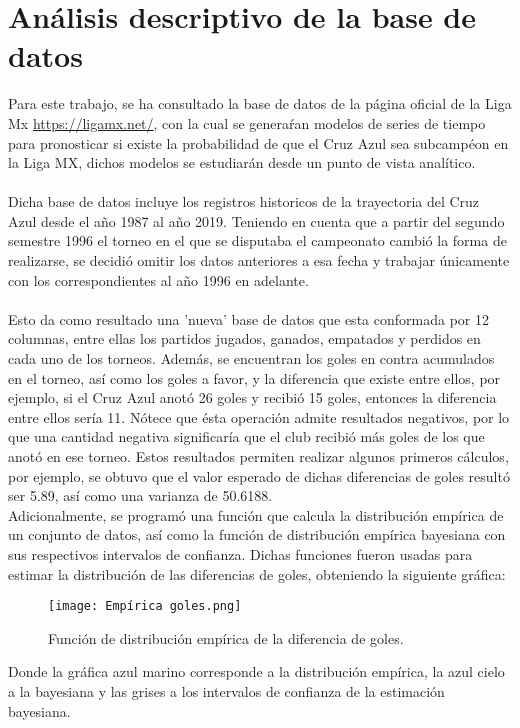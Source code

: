 \documentclass{article}
\theoremstyle{remark}
\begin{document}
\newpage
\section{Análisis descriptivo de la base de datos}
Para este trabajo, se ha consultado la base de datos de la página oficial de la Liga Mx \url{https://ligamx.net/}, con la cual se generaŕan modelos de series de tiempo para pronosticar si existe la probabilidad de que el Cruz Azul sea subcampéon en la Liga MX, dichos modelos se estudiarán desde un punto de vista analítico.\\ \\ 
Dicha base de datos incluye los registros historicos de la trayectoria del Cruz Azul desde el año 1987 al año 2019. Teniendo en cuenta que a partir del segundo semestre 1996 el torneo en el que se disputaba el campeonato cambió la forma de realizarse, se decidió omitir los datos anteriores a esa fecha y trabajar únicamente con los correspondientes al año 1996 en adelante.\\ \\
Esto da como resultado una 'nueva' base de datos que esta conformada por 12 columnas, entre ellas los partidos jugados, ganados, empatados y perdidos en cada uno de los torneos. Además, se encuentran los goles en contra acumulados en el torneo, así como los goles a favor, y la diferencia que existe entre ellos, por ejemplo, si el Cruz Azul anotó 26 goles y recibió 15 goles, entonces la diferencia entre ellos sería 11. Nótece que ésta operación admite resultados  negativos, por lo que una cantidad negativa significaría que el club recibió más goles de los que anotó en ese torneo. Estos resultados permiten realizar algunos primeros cálculos, por ejemplo, se obtuvo que el valor esperado de dichas diferencias de goles resultó ser 5.89, así como una varianza de 50.6188.\\
Adicionalmente, se programó una función que calcula la distribución empírica de un conjunto de datos, así como la función de distribución empírica bayesiana con sus respectivos intervalos de confianza. Dichas funciones fueron usadas para estimar la distribución de  las diferencias de goles, obteniendo la siguiente gráfica:
\begin{figure}[H]
    \centering
    \texttt{[image: Empírica goles.png]}
    \caption{Función de distribución empírica de la diferencia de goles.}
    \label{fig:FDE.DG}
\end{figure}
Donde la gráfica azul marino corresponde a la distribución empírica, la azul cielo a la bayesiana y las grises a los intervalos de confianza de la estimación bayesiana.\\
\end{document}
